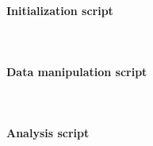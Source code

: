 \paragraph{Initialization script} \ \vspace{10pt}



\paragraph{Data manipulation script} \ \vspace{10pt}



\paragraph{Analysis script} \ \vspace{10pt}




